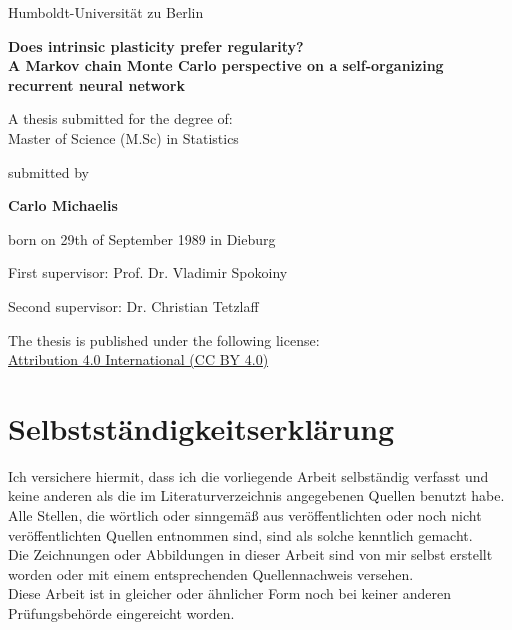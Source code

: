 \documentclass[12pt]{article}
\begin{document}
\thispagestyle{empty}

\begin{spacing}{1.1}
\begin{center}

\Large Humboldt-Universität zu Berlin


\setlength{\parskip}{6em}
\LARGE \textbf{Does intrinsic plasticity prefer regularity?\\ A Markov chain Monte Carlo perspective on a self-organizing recurrent neural network}

\setlength{\parskip}{4em}
\normalsize A thesis submitted for the degree of:\\ Master of Science (M.Sc) in Statistics

\setlength{\parskip}{1.5em}
\normalsize submitted by

\setlength{\parskip}{1.5em}
\Large \textbf{Carlo Michaelis}

\setlength{\parskip}{0.5em}
\normalsize born on 29th of September 1989 in Dieburg

\setlength{\parskip}{4em}

First supervisor: Prof. Dr. Vladimir Spokoiny

\setlength{\parskip}{0.3em}
Second supervisor: Dr. Christian Tetzlaff

\vfill

The thesis is published under the following license:\\ \href{https://creativecommons.org/licenses/by/4.0/}{Attribution 4.0 International (CC BY 4.0)}

\end{center}
\end{spacing}
\newpage

\section*{Selbstständigkeitserklärung}

Ich versichere hiermit, dass ich die vorliegende Arbeit selbständig verfasst und keine anderen als die im Literaturverzeichnis angegebenen Quellen benutzt habe.\\ 
Alle Stellen, die wörtlich oder sinngemäß aus veröffentlichten oder noch nicht veröffentlichten Quellen entnommen sind, sind als solche kenntlich gemacht.\\
Die Zeichnungen oder Abbildungen in dieser Arbeit sind von mir selbst erstellt worden oder mit einem entsprechenden Quellennachweis versehen.\\ 
Diese Arbeit ist in gleicher oder ähnlicher Form noch bei keiner anderen Prüfungsbehörde eingereicht worden.
\end{document}
